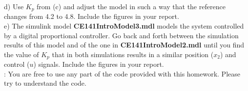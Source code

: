 \documentclass{article}
\begin{document}
\noindent d) Use $K_p$ from (c) and adjust the model in such a way that the reference changes from 4.2 to 4.8. Include the figures in your report.  \\

\noindent e) The simulink model {\bf CE141IntroModel3.mdl} 
models the system controlled by a digital proportional controller. 
Go back and forth between the simulation results of this model 
and of the one in {\bf CE141IntroModel2.mdl} until you find 
the value of $K_p$ that in both simulations results in a similar 
position ($x_2$) and control ($u$) signals. Include the figures 
in your report.  \\

: You are free to use any part of the code provided with this homework. Please try to understand the code.
\end{document}
